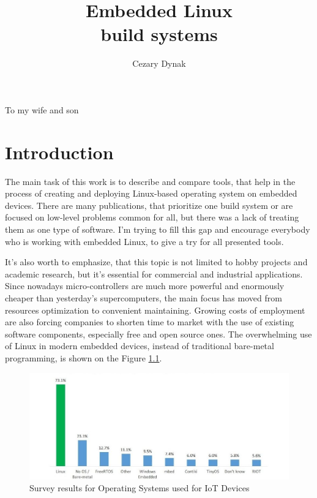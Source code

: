 \documentclass[printmode]{mgr}
\title{Embedded Linux \\ build systems}
\author{Cezary Dynak}
\begin{document}
%


\maketitle
\dedication{6cm}{To my wife and son}

\tableofcontents




















\chapter{Introduction}

The main task of this work is to describe and compare tools, that help in the process of creating and deploying Linux-based operating system on embedded devices.
There are many publications, that prioritize one build system or are focused on low-level problems common for all, but there was a lack of treating them as one type of software.
I'm trying to fill this gap and encourage everybody who is working with embedded Linux, to give a try for all presented tools.

It's also worth to emphasize, that this topic is not limited to hobby projects and academic research, but it's essential for commercial and industrial applications.
Since nowadays micro-controllers are much more powerful and enormously cheaper than yesterday's supercomputers, the main focus has moved from resources optimization to convenient maintaining.
Growing costs of employment are also forcing companies to shorten time to market with the use of existing software components, especially free and open source ones.
The overwhelming use of Linux in modern embedded devices, instead of traditional bare-metal programming, is shown on the Figure \ref{fig:iot-os}.

\begin{figure}[htbp]
  \centering
    \includegraphics[width=\textwidth]{iot-os.jpg}
    \caption{Survey results for Operating Systems used for IoT Devices\cite{web:iot-os}}
  \label{fig:iot-os}
\end{figure}
\end{document}
